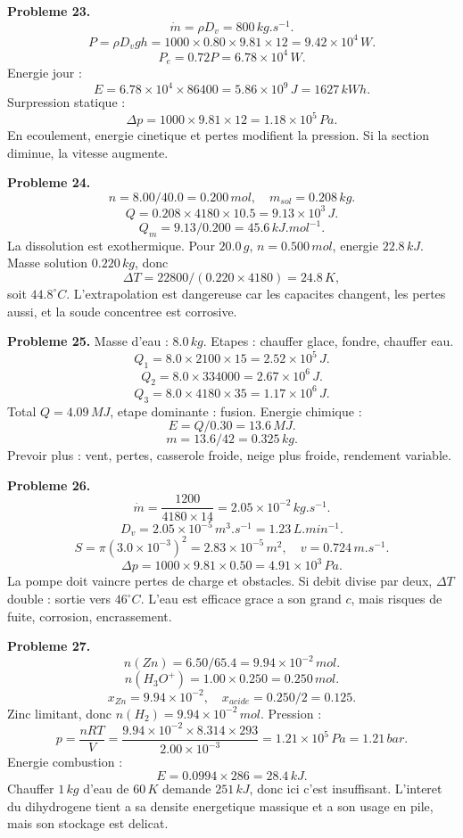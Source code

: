 \documentclass[11pt,a4paper]{article}
\begin{document}
\begin{corrige}
\textbf{Probleme 23.}
\[
\dot m=\rho D_v=800\,kg.s^{-1}.
\]
\[
P=\rho D_vgh=1000\times0.80\times9.81\times12=9.42\times10^4\,W.
\]
\[
P_e=0.72P=6.78\times10^4\,W.
\]
Energie jour :
\[
E=6.78\times10^4\times86400=5.86\times10^9\,J=1627\,kWh.
\]
Surpression statique :
\[
\Delta p=1000\times9.81\times12=1.18\times10^5\,Pa.
\]
En ecoulement, energie cinetique et pertes modifient la pression. Si la section diminue, la vitesse augmente.
\end{corrige}

\begin{corrige}
\textbf{Probleme 24.}
\[
n=8.00/40.0=0.200\,mol,
\quad m_{sol}=0.208\,kg.
\]
\[
Q=0.208\times4180\times10.5=9.13\times10^3\,J.
\]
\[
Q_m=9.13/0.200=45.6\,kJ.mol^{-1}.
\]
La dissolution est exothermique. Pour \(20.0\,g\), \(n=0.500\,mol\), energie \(22.8\,kJ\). Masse solution \(0.220\,kg\), donc
\[
\Delta T=22800/(0.220\times4180)=24.8\,K,
\]
soit \(44.8^\circ C\). L'extrapolation est dangereuse car les capacites changent, les pertes aussi, et la soude concentree est corrosive.
\end{corrige}

\begin{corrige}
\textbf{Probleme 25.}
Masse d'eau : \(8.0\,kg\). Etapes : chauffer glace, fondre, chauffer eau.
\[
Q_1=8.0\times2100\times15=2.52\times10^5\,J.
\]
\[
Q_2=8.0\times334000=2.67\times10^6\,J.
\]
\[
Q_3=8.0\times4180\times35=1.17\times10^6\,J.
\]
Total \(Q=4.09\,MJ\), etape dominante : fusion. Energie chimique :
\[
E=Q/0.30=13.6\,MJ.
\]
\[
m=13.6/42=0.325\,kg.
\]
Prevoir plus : vent, pertes, casserole froide, neige plus froide, rendement variable.
\end{corrige}

\begin{corrige}
\textbf{Probleme 26.}
\[
\dot m=\frac{1200}{4180\times14}=2.05\times10^{-2}\,kg.s^{-1}.
\]
\[
D_v=2.05\times10^{-5}\,m^3.s^{-1}=1.23\,L.min^{-1}.
\]
\[
S=\pi(3.0\times10^{-3})^2=2.83\times10^{-5}\,m^2,
\quad v=0.724\,m.s^{-1}.
\]
\[
\Delta p=1000\times9.81\times0.50=4.91\times10^3\,Pa.
\]
La pompe doit vaincre pertes de charge et obstacles. Si debit divise par deux, \(\Delta T\) double : sortie vers \(46^\circ C\). L'eau est efficace grace a son grand \(c\), mais risques de fuite, corrosion, encrassement.
\end{corrige}

\begin{corrige}
\textbf{Probleme 27.}
\[
n(Zn)=6.50/65.4=9.94\times10^{-2}\,mol.
\]
\[
n(H_3O^+)=1.00\times0.250=0.250\,mol.
\]
\[
x_{Zn}=9.94\times10^{-2},\quad x_{acide}=0.250/2=0.125.
\]
Zinc limitant, donc \(n(H_2)=9.94\times10^{-2}\,mol\). Pression :
\[
p=\frac{nRT}{V}=\frac{9.94\times10^{-2}\times8.314\times293}{2.00\times10^{-3}}=1.21\times10^5\,Pa=1.21\,bar.
\]
Energie combustion :
\[
E=0.0994\times286=28.4\,kJ.
\]
Chauffer \(1\,kg\) d'eau de \(60\,K\) demande \(251\,kJ\), donc ici c'est insuffisant. L'interet du dihydrogene tient a sa densite energetique massique et a son usage en pile, mais son stockage est delicat.
\end{corrige}
\end{document}
